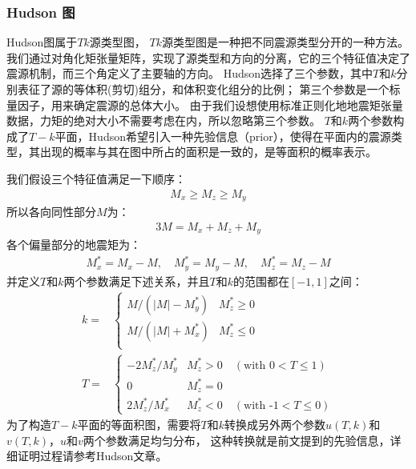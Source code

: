 \subsubsection{Hudson 图}

Hudson图属于$Tk$源类型图\citep{Hudson1989}，
$Tk$源类型图是一种把不同震源类型分开的一种方法。
我们通过对角化矩张量矩阵，实现了源类型和方向的分离，它的三个特征值决定了震源机制，而三个角定义了主要轴的方向。
Hudson选择了三个参数，其中$T$和$k$分别表征了源的等体积(剪切)组分，和体积变化组分的比例；
第三个参数是一个标量因子，用来确定震源的总体大小。
由于我们设想使用标准正则化地地震矩张量数据，力矩的绝对大小不需要考虑在内，所以忽略第三个参数。
$T$和$k$两个参数构成了$T-k$平面，Hudson希望引入一种先验信息（prior），使得在平面内的震源类型，其出现的概率与其在图中所占的面积是一致的，是等面积的概率表示。

我们假设三个特征值满足一下顺序：
\begin{align}
    M_x \geq M_z \geq M_y
\end{align}
所以各向同性部分$M$为：
\begin{align}
    3M =M_x + M_z + M_y
\end{align}
各个偏量部分的地震矩为：
\begin{align}
    M_x^*  =M_x -M,  \quad M_y^*  =M_y -M, \quad M_z^*  =M_z -M
\end{align}
并定义$T$和$k$两个参数满足下述关系，并且$T$和$k$的范围都在$[-1,1]$之间：
\begin{align}
    k= &
    \begin{cases}
        M/(|M|-M_y^*)   &  M_z^* \geq 0 \\
        M/(|M|+M_x^*)   &  M_z^* \leq 0 \\
    \end{cases} \\
    T= &
    \begin{cases}
        -2M_z^*/M_y^*   &  M_z^* > 0 \quad (\text{with 0}<T \leq 1) \\
        0 &  M_z^* = 0 \\
        2M_z^*/M_x^*   &  M_z^* < 0 \quad (\text{with -1}<T \leq 0)
    \end{cases}
\end{align}
为了构造$T-k$平面的等面积图，需要将$T$和$k$转换成另外两个参数$u(T,k)$和$v(T,k)$，$u$和$v$两个参数满足均匀分布，
这种转换就是前文提到的先验信息，详细证明过程请参考Hudson文章\citep{Hudson1989}。

